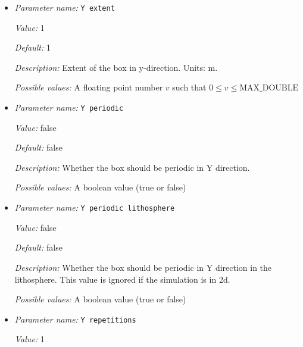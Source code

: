 \begin{itemize}
{\it Default:} 1


{\it Description:} Number of cells in X direction of the lower box. The same number of repetitions will be used in the upper box.


{\it Possible values:} An integer $n$ such that $1\leq n \leq 2147483647$
\item {\it Parameter name:} {\tt Y extent}
\label{parameters:Geometry model/Box with lithosphere boundary indicators/Y extent}


{\it Value:} 1


{\it Default:} 1


{\it Description:} Extent of the box in y-direction. Units: m.


{\it Possible values:} A floating point number $v$ such that $0 \leq v \leq \text{MAX\_DOUBLE}$
\item {\it Parameter name:} {\tt Y periodic}
\label{parameters:Geometry model/Box with lithosphere boundary indicators/Y periodic}


{\it Value:} false


{\it Default:} false


{\it Description:} Whether the box should be periodic in Y direction.


{\it Possible values:} A boolean value (true or false)
\item {\it Parameter name:} {\tt Y periodic lithosphere}
\label{parameters:Geometry model/Box with lithosphere boundary indicators/Y periodic lithosphere}


{\it Value:} false


{\it Default:} false


{\it Description:} Whether the box should be periodic in Y direction in the lithosphere. This value is ignored if the simulation is in 2d. 


{\it Possible values:} A boolean value (true or false)
\item {\it Parameter name:} {\tt Y repetitions}
\label{parameters:Geometry model/Box with lithosphere boundary indicators/Y repetitions}


{\it Value:} 1



\end{itemize}
